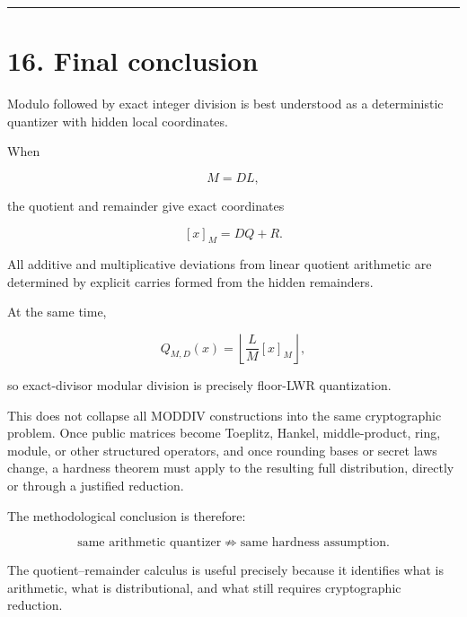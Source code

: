 \documentclass[11pt,a4paper]{article}
\begin{document}
\begin{center}\rule{0.5\linewidth}{0.5pt}\end{center}

\section{16. Final conclusion}\label{final-conclusion}

Modulo followed by exact integer division is best understood as a deterministic quantizer with hidden local coordinates.

When

\[
M=DL,
\]

the quotient and remainder give exact coordinates

\[
[x]_M=DQ+R.
\]

All additive and multiplicative deviations from linear quotient arithmetic are determined by explicit carries formed from the hidden remainders.

At the same time,

\[
Q_{M,D}(x)
=
\left\lfloor\frac{L}{M}[x]_M\right\rfloor,
\]

so exact-divisor modular division is precisely floor-LWR quantization.

This does not collapse all MODDIV constructions into the same cryptographic problem. Once public matrices become Toeplitz, Hankel, middle-product, ring, module, or other structured operators, and once rounding bases or secret laws change, a hardness theorem must apply to the resulting full distribution, directly or through a justified reduction.

The methodological conclusion is therefore:

\[
\boxed{
\text{same arithmetic quantizer}
\not\Rightarrow
\text{same hardness assumption}.
}
\]

The quotient--remainder calculus is useful precisely because it identifies what is arithmetic, what is distributional, and what still requires cryptographic reduction.
\end{document}
